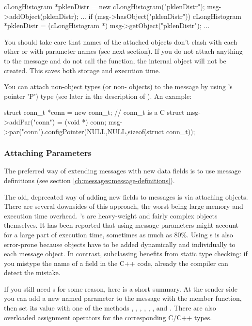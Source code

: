\begin{cpp}
cLongHistogram *pklenDistr = new cLongHistogram("pklenDistr");
msg->addObject(pklenDistr);
...
if (msg->hasObject("pklenDistr"))
{
   cLongHistogram *pklenDistr =
       (cLongHistogram *) msg->getObject("pklenDistr");
   ...
}
\end{cpp}

You should take care that names of the attached objects don't
clash with each other or with  parameter names
(see next section).
If you do not attach anything to the message and do not call the
 function, the internal  object
will not be created. This saves both storage and execution time.

You can attach non-object types (or non- objects) to
the message by using
's  pointer 'P') type (see later in the description
of ). An example:

\begin{cpp}
struct conn_t *conn = new conn_t; // conn_t is a C struct
msg->addPar("conn") = (void *) conn;
msg->par("conn").configPointer(NULL,NULL,sizeof(struct conn_t));
\end{cpp}




\subsubsection{Attaching Parameters}

The preferred way of extending messages with new data fields is to use
message definitions (see section \ref{ch:messages:message-definitions}).

The old, deprecated way of adding new fields to messages is via
attaching  objects.
There are several downsides of this approach, the worst being
large memory and execution time overhead. 's are
heavy-weight and fairly complex objects themselves.
It has been reported that using  message parameters
might account for a large part of execution time, sometimes as much as 80\%.
Using s is also error-prone because  objects
have to be added dynamically and individually to each message object.
In contrast, subclassing benefits from static type checking:
if you mistype the name of a field in the C++ code, already the compiler
can detect the mistake.

If you still need s for some reason, here is a short summary.
At the sender side you can add a new named parameter to the message
with the  member function, then set its value with
one of the methods , ,
, , ,
, and . There are also overloaded
assignment operators for the corresponding C/C++ types.

